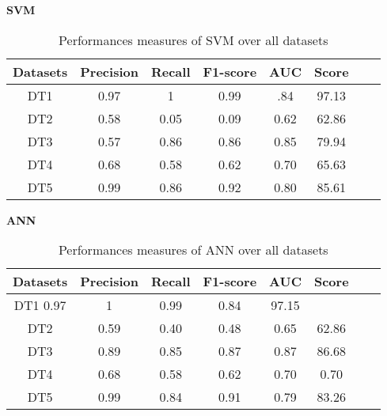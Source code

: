 \documentclass[10pt,a4paper]{article}
\begin{document}
\begin{center}
\textbf{SVM}

\end{center}
\begin{table}[!ht]
\centering
\begin{tabular}{*{6}{c}l r}
  \toprule
  \textbf{Datasets} & \textbf{Precision} & \textbf{Recall} & \textbf{F1-score}&\textbf{AUC} &\textbf{Score}\\
   \midrule
  DT1 &0.97 &1   &0.99 &.84 &97.13 \\
  DT2 &0.58  &0.05   & 0.09&0.62&62.86\\
  DT3 &0.57 & 0.86&0.86&0.85&79.94\\
  DT4 & 0.68&0.58&0.62&0.70&65.63\\
  DT5 &0.99 &0.86&0.92&0.80&85.61\\
    \bottomrule
\end{tabular}
\caption{Performances measures of SVM over all datasets}\label{perf-measure-dt1}
\end{table}
\begin{center}
\textbf{ANN}
\end{center}
\begin{table}[!ht]
\centering
\begin{tabular}{*{6}{c}l r}
  \toprule
  \textbf{Datasets} & \textbf{Precision} & \textbf{Recall} & \textbf{F1-score}&\textbf{AUC} &\textbf{Score}\\
   \midrule
  DT1 0.97&1 &0.99   &0.84 &97.15  \\
  DT2 &0.59  &0.40   &0.48&0.65&62.86 \\
  DT3 &0.89 &0.85 &0.87&0.87&86.68\\
  DT4 &0.68 &0.58&0.62&0.70&0.70\\
  DT5 &0.99 &0.84&0.91&0.79&83.26\\ 
    \bottomrule
\end{tabular}
\caption{Performances measures of ANN over all datasets}\label{perf-measure-dt1}
\end{table}
\end{document}
